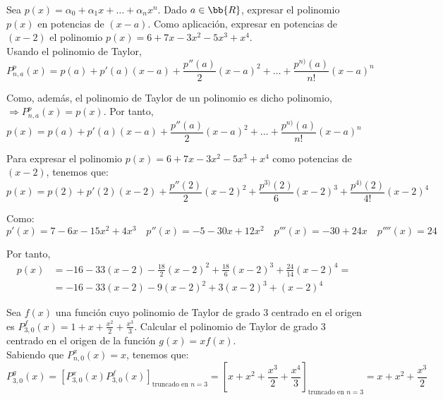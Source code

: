 \begin{ejercicio}
    Sea $p(x)=\alpha_0 + \alpha_1x + \dots + \alpha_nx^n$. Dado $a\in \bb{R}$, expresar el polinomio $p(x)$ en potencias de $(x-a)$. Como aplicación, expresar en potencias de $(x-2)$ el polinomio $p(x)=6+7x - 3x^2-5x^3+x^4$.\\

    Usando el polinomio de Taylor,
    \begin{equation*}
        P_{n, a}^p(x) = p(a) + p'(a)(x-a) + \frac{p''(a)}{2}(x-a)^2 + \dots + \frac{p^{n)}(a)}{n!}(x-a)^n
    \end{equation*}

    Como, además, el polinomio de Taylor de un polinomio es dicho polinomio, $ \Longrightarrow P_{n, a}^p(x) = p(x)$. Por tanto,
    \begin{equation*}
        p(x) = p(a) + p'(a)(x-a) + \frac{p''(a)}{2}(x-a)^2 + \dots + \frac{p^{n)}(a)}{n!}(x-a)^n
    \end{equation*}


    Para expresar el polinomio $p(x)=6+7x - 3x^2-5x^3+x^4$ como potencias de $(x-2)$, tenemos que:
    \begin{equation*}
        p(x) = p(2) + p'(2)(x-2) + \frac{p''(2)}{2}(x-2)^2 + \frac{p^{3)}(2)}{6}(x-2)^3 + \frac{p^{4)}(2)}{4!}(x-2)^4
    \end{equation*}

    Como:
    \begin{equation*}
        p'(x) = 7-6x-15x^2+4x^3 \quad
        p''(x) = -5-30x+12x^2
        \quad
        p'''(x) = -30+24x
        \quad
        p''''(x) = 24
    \end{equation*}

    Por tanto,
    \begin{equation*}\begin{split}
        p(x) &= -16 -33(x-2) - \frac{18}{2}(x-2)^2 + \frac{18}{6}(x-2)^3 + \frac{24}{14}(x-2)^4
        =\\&=
        -16 -33(x-2) - 9(x-2)^2 + 3(x-2)^3 + (x-2)^4
    \end{split}\end{equation*}
\end{ejercicio}

\begin{ejercicio}
    Sea $f(x)$ una función cuyo polinomio de Taylor de grado $3$ centrado en el origen es $P_{3,0}^f (x) = 1 + x + \frac{x^2}{2} + \frac{x^3}{3}$. Calcular el polinomio de Taylor de grado $3$ centrado en el origen de la función $g(x) = xf(x)$.\\

    Sabiendo que $P_{n,0}^{x}(x) = x$, tenemos que:
    $$P_{3,0}^{g}(x) = \left[P_{3,0}^{x}(x) P_{3,0}^{f}(x)\right]_{\text{truncado en } n=3} = \left[ x + x^2 + \frac{x^3}{2} + \frac{x^4}{3} \right]_{\text{truncado en } n=3} = x + x^2 + \frac{x^3}{2}$$
\end{ejercicio}

